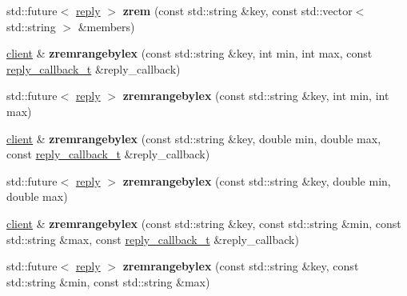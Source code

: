 \begin{DoxyCompactItemize}
std\+::future$<$ \hyperlink{classcpp__redis_1_1reply}{reply} $>$ {\bfseries zrem} (const std\+::string \&key, const std\+::vector$<$ std\+::string $>$ \&members)
\item 
\mbox{\label{classcpp__redis_1_1client_aff3c4f11d504ba64a98b6bce9bf319a0}} 
\hyperlink{classcpp__redis_1_1client}{client} \& {\bfseries zremrangebylex} (const std\+::string \&key, int min, int max, const \hyperlink{classcpp__redis_1_1client_a061a1140d36d2eaeda82b09a0bb3f9f2}{reply\+\_\+callback\+\_\+t} \&reply\+\_\+callback)
\item 
\mbox{\label{classcpp__redis_1_1client_a9277ebc759190ce6f085a60a98ad3a7c}} 
std\+::future$<$ \hyperlink{classcpp__redis_1_1reply}{reply} $>$ {\bfseries zremrangebylex} (const std\+::string \&key, int min, int max)
\item 
\mbox{\label{classcpp__redis_1_1client_ae03899c0520352eb6a800b9d6c12f2ae}} 
\hyperlink{classcpp__redis_1_1client}{client} \& {\bfseries zremrangebylex} (const std\+::string \&key, double min, double max, const \hyperlink{classcpp__redis_1_1client_a061a1140d36d2eaeda82b09a0bb3f9f2}{reply\+\_\+callback\+\_\+t} \&reply\+\_\+callback)
\item 
\mbox{\label{classcpp__redis_1_1client_a6ed8333a10d5c4390f3e52f91c436264}} 
std\+::future$<$ \hyperlink{classcpp__redis_1_1reply}{reply} $>$ {\bfseries zremrangebylex} (const std\+::string \&key, double min, double max)
\item 
\mbox{\label{classcpp__redis_1_1client_a8fe114da4df2dfd2ab5240554444a294}} 
\hyperlink{classcpp__redis_1_1client}{client} \& {\bfseries zremrangebylex} (const std\+::string \&key, const std\+::string \&min, const std\+::string \&max, const \hyperlink{classcpp__redis_1_1client_a061a1140d36d2eaeda82b09a0bb3f9f2}{reply\+\_\+callback\+\_\+t} \&reply\+\_\+callback)
\item 
\mbox{\label{classcpp__redis_1_1client_a1350d0df45d5b41c940d782682b41bd9}} 
std\+::future$<$ \hyperlink{classcpp__redis_1_1reply}{reply} $>$ {\bfseries zremrangebylex} (const std\+::string \&key, const std\+::string \&min, const std\+::string \&max)
\item 

\end{DoxyCompactItemize}
